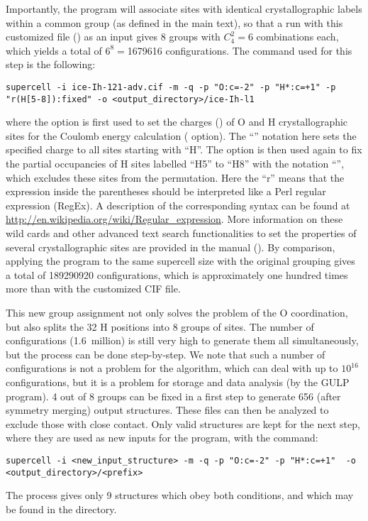 \documentclass[a4paper,10pt]{article}
\begin{document}
Importantly, the \sups{} program will associate sites with identical crystallographic labels within a common group (as defined in the main text), so that a run with this customized file () as an input gives 8 groups with $C^2_4=6$ combinations each, which yields a total of $6^8=$\num{1679616} configurations. The \sups{} command used for this step is the following:
\begin{Verbatim}[breaklines]
  supercell -i ice-Ih-121-adv.cif -m -q -p "O:c=-2" -p "H*:c=+1" -p "r(H[5-8]):fixed" -o <output_directory>/ice-Ih-l1
\end{Verbatim}
where the  option is first used to set the charges () of O and H crystallographic sites for the Coulomb energy calculation ( option). The ``'' notation here sets the specified charge to all sites starting with ``H''. The  option is then used again to fix the partial occupancies of H sites labelled ``H5'' to ``H8'' with the notation ``'', which excludes these sites from the permutation. Here the ``r'' means that the expression inside the parentheses should be interpreted like a Perl regular expression (RegEx). A description of the corresponding syntax can be found at \url{http://en.wikipedia.org/wiki/Regular_expression}. More information on these wild cards and other advanced text search functionalities to set the properties of several crystallographic sites are provided in the manual (). By comparison, applying the \sups{} program to the same supercell size with the original grouping gives a total of \num{189290920} configurations, which is approximately one hundred times more than with the customized CIF file.

This new group assignment not only solves the problem of the O coordination, but also splits the 32 H positions into 8 groups of sites. The number of configurations (1.6~million) is still very high to generate them all simultaneously, but the process can be done step-by-step. We note that such a number of configurations is not a problem for the \sups{} algorithm, which can deal with up to ${10^16}$ configurations, but it is a problem for storage and data analysis (by the GULP program). 4 out of 8 groups can be fixed in a first step to generate 656 (after symmetry merging) output structures. These files can then be analyzed to exclude those with  close contact. Only valid structures are kept for the next step, where they are used as new inputs for the \sups{} program, with the command:
\begin{Verbatim}[breaklines]
  supercell -i <new_input_structure> -m -q -p "O:c=-2" -p "H*:c=+1"  -o <output_directory>/<prefix>
\end{Verbatim}
The process gives only 9 structures which obey both conditions, and which may be found in the \linebreak {} directory.
\end{document}
